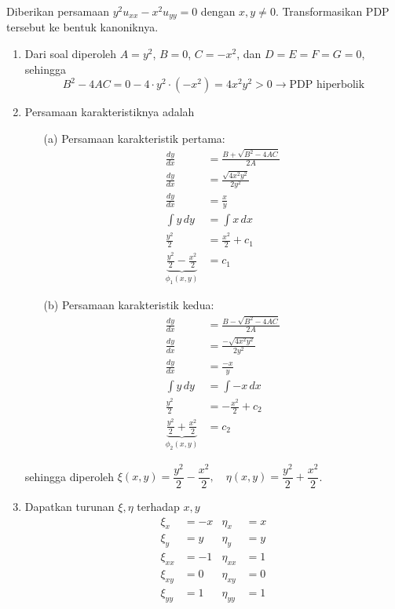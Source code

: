 \documentclass[a4paper]{article}
\theoremstyle{definition}
\begin{document}
\pagestyle{fancy}
Diberikan persamaan $y^2 u_{xx} - x^2 u_{yy} = 0$ dengan $x, y \ne 0$. Transformasikan PDP tersebut ke bentuk kanoniknya.

\begin{enumerate}
  \item Dari soal diperoleh $A = y^2$, $B = 0$, $C = -x^2$, dan $D = E = F = G = 0$, sehingga
  \[
  B^2 - 4AC = 0 - 4 \cdot y^2 \cdot (-x^2) = 4x^2 y^2 > 0 \rightarrow \text{PDP hiperbolik}
  \]

  \item Persamaan karakteristiknya adalah
  \begin{itemize}
    \item[(a)] Persamaan karakteristik pertama:
    \begin{align*}
      \frac{dy}{dx} &= \frac{B + \sqrt{B^2 - 4AC}}{2A} \\
      \frac{dy}{dx} &= \frac{\sqrt{4x^2 y^2}}{2y^2} \\
      \frac{dy}{dx} &= \frac{x}{y} \\
      \int y \, dy &= \int x \, dx \\
      \frac{y^2}{2} &= \frac{x^2}{2} + c_1 \\
      \underbrace{\frac{y^2}{2} - \frac{x^2}{2}}_{\phi_1(x,y)} &= c_1
    \end{align*}

    \item[(b)] Persamaan karakteristik kedua:
      \begin{align*}
        \frac{dy}{dx} &= \frac{B - \sqrt{B^2 - 4AC}}{2A} \\
        \frac{dy}{dx} &= \frac{-\sqrt{4x^2 y^2}}{2y^2} \\
        \frac{dy}{dx} &= \frac{-x}{y} \\
        \int y \, dy &= \int -x \, dx \\
        \frac{y^2}{2} &= -\frac{x^2}{2} + c_2 \\
        \underbrace{\frac{y^2}{2} + \frac{x^2}{2}}_{\phi_2(x,y)} &= c_2
      \end{align*}
  \end{itemize}
  sehingga diperoleh $\xi(x,y) = \dfrac{y^2}{2} - \dfrac{x^2}{2}, \quad \eta(x,y) = \dfrac{y^2}{2} + \dfrac{x^2}{2}$.

  \item Dapatkan turunan $\xi, \eta$ terhadap $x, y$
  \begin{align*}
  \xi_x &= -x & \eta_x &= x  \\
  \xi_y &= y  & \eta_y &= y  \\
  \xi_{xx} &= -1 & \eta_{xx} &= 1 \\
  \xi_{xy} &= 0 & \eta_{xy} &= 0 \\
  \xi_{yy} &= 1 & \eta_{yy} &= 1
  \end{align*}


\end{enumerate}
\end{document}
